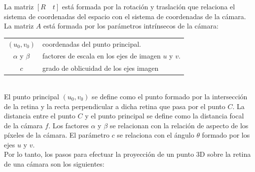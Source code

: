 La matriz $[R \quad t]$ está formada por la rotación y traslación que relaciona el sistema de coordenadas del espacio con el sistema de coordenadas de la cámara. La matriz $A$ está formada por los parámetros intrínsecos de la cámara:\\



\begin{tabular}{cp{}}


$(u_0, v_0)$ &  coordenadas del punto principal. \\ 
$\alpha$ y $\beta$ & factores de escala en los ejes de imagen  $u$ y $v$. \\ 
$c$ & grado de oblicuidad de los ejes imagen
\end{tabular} \\

El punto principal $(u_0, v_0)$ se define como el punto formado por la intersección de la retina y la recta perpendicular a dicha retina que pasa por el punto $C$. La distancia entre el punto $C$ y el punto principal se define como la distancia focal de la cámara $f$. Los factores $\alpha$ y $\beta$ se relacionan con la relación de aspecto de los píxeles de la cámara. El parámetro $c$ se relaciona con el ángulo $\theta$ formado por los ejes $u$ y $v$.\\

Por lo tanto, los pasos para efectuar la proyección de un punto 3D sobre la retina de una cámara son los siguientes:\\

